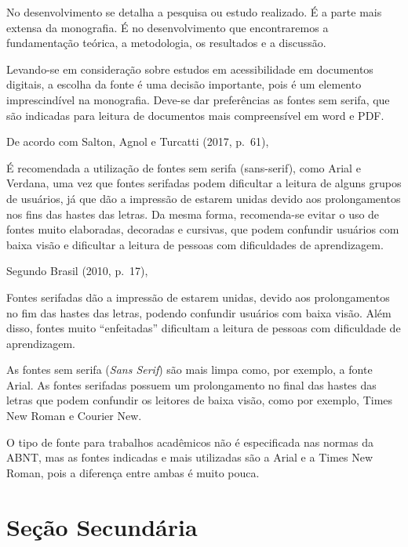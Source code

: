 No desenvolvimento se detalha a pesquisa ou estudo realizado. É a parte mais
extensa da monografia. É no desenvolvimento que encontraremos a fundamentação
teórica, a metodologia, os resultados e a discussão.

Levando-se em consideração sobre estudos em acessibilidade em documentos
digitais, a escolha da fonte é uma decisão importante, pois é um elemento
imprescindível na monografia. Deve-se dar preferências as fontes sem serifa,
que são indicadas para leitura de documentos mais compreensível em word e PDF.

De acordo com Salton, Agnol e Turcatti (2017, p.~61),

\begin{citacaolonga}
É recomendada a utilização de fontes sem serifa (sans-serif), como Arial e
Verdana, uma vez que fontes serifadas podem dificultar a leitura de alguns
grupos de usuários, já que dão a impressão de estarem unidas devido aos
prolongamentos nos fins das hastes das letras. Da mesma forma, recomenda-se
evitar o uso de fontes muito elaboradas, decoradas e cursivas, que podem
confundir usuários com baixa visão e dificultar a leitura de pessoas com
dificuldades de aprendizagem.
\end{citacaolonga}

Segundo Brasil (2010, p.~17),

\begin{citacaolonga}
Fontes serifadas dão a impressão de estarem unidas, devido aos prolongamentos
no fim das hastes das letras, podendo confundir usuários com baixa visão. Além
disso, fontes muito ``enfeitadas'' dificultam a leitura de pessoas com
dificuldade de aprendizagem.
\end{citacaolonga}

As fontes sem serifa (\textit{Sans Serif}) são mais limpa como, por exemplo, a
fonte Arial. As fontes serifadas possuem um prolongamento no final das hastes
das letras que podem confundir os leitores de baixa visão, como por exemplo,
Times New Roman e Courier New.

O tipo de fonte para trabalhos acadêmicos não é especificada nas normas da
ABNT, mas as fontes indicadas e mais utilizadas são a Arial e a Times New
Roman, pois a diferença entre ambas é muito pouca.

\textopadrao

\textopadrao

\section{Seção Secundária}

